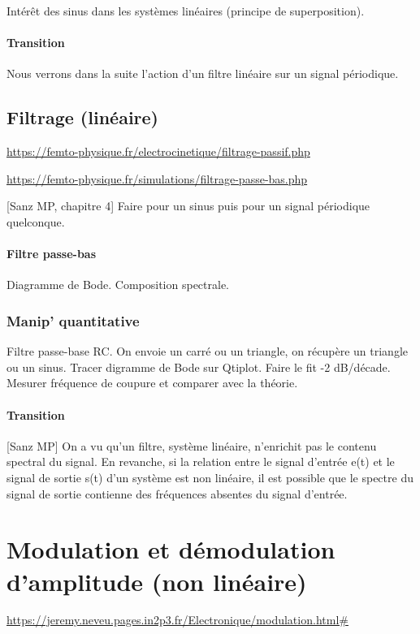 \documentclass[11pt]{report}
\numberwithin{figure}{section}
\numberwithin{equation}{section}
\numberwithin{table}{section}
\newcommand{\1}{\boldsymbol{1}}
\begin{document}
Intérêt des sinus dans les systèmes linéaires (principe de superposition).

\paragraph{Transition} Nous verrons dans la suite l'action d'un filtre linéaire sur un signal périodique.


\subsection{Filtrage (linéaire)}

\url{https://femto-physique.fr/electrocinetique/filtrage-passif.php}

\url{https://femto-physique.fr/simulations/filtrage-passe-bas.php}

[Sanz MP, chapitre 4] Faire pour un sinus puis pour un signal périodique quelconque. 

\paragraph{Filtre passe-bas} Diagramme de Bode. Composition spectrale.

\subsubsection{Manip' quantitative} Filtre passe-base RC. On envoie un carré ou un triangle, on récupère un triangle ou un sinus. Tracer digramme de Bode sur Qtiplot. Faire le fit -2 dB/décade. Mesurer fréquence de coupure et comparer avec la théorie. 

\paragraph{Transition} [Sanz MP] On a vu qu’un filtre, système linéaire, n’enrichit pas le contenu spectral du signal. En revanche, si la relation entre le signal d’entrée e(t) et le signal de sortie s(t) d’un système est non linéaire, il est possible que le spectre du signal de sortie contienne des fréquences absentes du signal d’entrée.

\section{Modulation et démodulation d'amplitude (non linéaire)}

\url{https://jeremy.neveu.pages.in2p3.fr/Electronique/modulation.html#}
\end{document}
